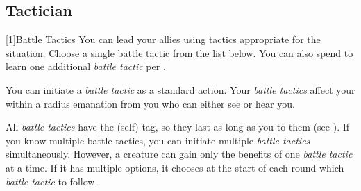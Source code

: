     \subsection{Tactician}

        [1]{Battle Tactics}
        You can lead your allies using tactics appropriate for the situation.
        Choose a single battle tactic from the list below.
        You can also spend  to learn one additional \textit{battle tactic} per .

        You can initiate a \textit{battle tactic} as a standard action.
        Your \textit{battle tactics} affect your  within a \arealarge radius emanation from you who can either see or hear you.

        All \textit{battle tactics} have the  (self) tag, so they last as long as you  to them (see ).
        If you know multiple battle tactics, you can initiate multiple \textit{battle tactics} simultaneously.
        However, a creature can gain only the benefits of one \textit{battle tactic} at a time.
        If it has multiple options, it chooses at the start of each round which \textit{battle tactic} to follow.

